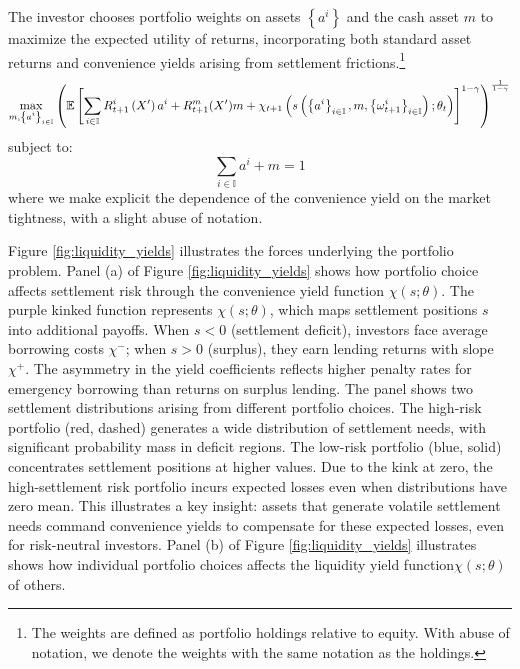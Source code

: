 \documentclass[12pt,american,english,notitlepage]{article}
\begin{document}
The investor chooses portfolio weights on assets $\left\{ a^{i}\right\} $ and the cash asset $m$ to maximize the expected utility of returns, incorporating both standard asset returns and convenience yields arising from settlement frictions.\footnote{
The weights are defined as portfolio holdings relative to equity.
With abuse of notation, we denote the weights with the same notation
as the holdings.
}
\begin{equation}
\max_{\substack{m,\left\{ a^{i}\right\} _{i\in\mathbb{I}}}
}\left(\mathbb{E}\left[\sum_{i\in\mathbb{I}}R_{t+1}^{i}\left(X'\right)a^{i}+R_{t+1}^{m}(X')m+\chi_{t+1}\left(s\left(\left\{ a^{i}\right\} _{i\in\mathbb{I}},m,\left\{ \omega_{t+1}^{i}\right\} _{i\in\mathbb{I}}\right);\theta_{t}\right)\right]^{1-\gamma}\right)^{\frac{1}{1-\gamma}}\label{eq:portf-1}
\end{equation}
subject to:
\[
\sum_{i\in\mathbb{I}}a^{i}+m=1
\]
where we make explicit the dependence of the convenience yield on the market
tightness, with a slight abuse of notation.

Figure \ref{fig:liquidity_yields} illustrates the forces underlying the portfolio problem.
Panel (a) of Figure \ref{fig:liquidity_yields}
shows how portfolio choice affects settlement risk through the
convenience yield function $\chi\left(s;\theta\right)$. The purple kinked
function represents $\chi\left(s;\theta\right)$, which maps settlement
positions $s$ into additional payoffs. When $s<0$ (settlement deficit),
investors face average borrowing costs $\chi^{-}$; when $s>0$ (surplus),
they earn lending returns with slope $\chi^{+}$. The asymmetry in
the yield coefficients reflects higher penalty rates for emergency
borrowing than returns on surplus lending. The panel shows two settlement
distributions arising from different portfolio choices. The high-risk
portfolio (red, dashed) generates a wide distribution of settlement
needs, with significant probability mass in deficit regions. The low-risk
portfolio (blue, solid) concentrates settlement positions at higher
values. Due to the kink at zero, the high-settlement risk portfolio
incurs expected losses even when distributions have zero mean. This
illustrates a key insight: assets that generate volatile settlement
needs command convenience yields to compensate for these expected
losses, even for risk-neutral investors. Panel (b) of Figure \ref{fig:liquidity_yields}
illustrates shows how individual portfolio choices affects the liquidity
yield function$\chi\left(s;\theta\right)$ of others. 
\end{document}
